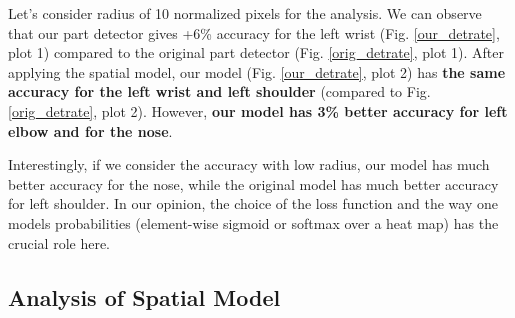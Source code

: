 \documentclass[a4paper,10pt]{article}
\begin{document}
	Let's consider radius of 10 normalized pixels for the analysis. We can observe that our part detector gives +6\% accuracy for the left wrist (Fig. \ref{our_detrate}, plot 1) compared to the original part detector (Fig. \ref{orig_detrate}, plot 1). After applying the spatial model, our model (Fig. \ref{our_detrate}, plot 2) has \textbf{the same accuracy for the left wrist and left shoulder} (compared to Fig. \ref{orig_detrate}, plot 2). However, \textbf{our model has 3\% better accuracy for left elbow and for the nose}. 
	
	Interestingly, if we consider the accuracy with low radius, our model has much better accuracy for the nose, while the original model has much better accuracy for left shoulder. In our opinion, the choice of the loss function and the way one models probabilities (element-wise sigmoid or softmax over a heat map) has the crucial role here.
	
	
	\subsection{Analysis of Spatial Model}
	
\end{document}

